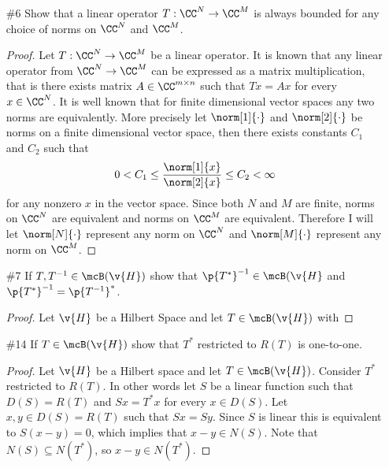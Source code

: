 \documentclass[11pt, oneside]{article}
\begin{document}
\begin{enumerate}
\begin{proof}
      Lastly I will show that $\norm{S} = \norm{T}$.
      Consider the following.
      \begin{align*}
        \norm{S} &= \sup*[x \in \overline{D(T)}]{\frac{\norm[Y]{Sx}}{\norm[X]{x}}} \\
      \end{align*}
    \end{proof}

  \pagebreak
  \item[\#6]
    Show that a linear operator $T:\CC^N \to \CC^M$ is always bounded for
    any choice of norms on $\CC^N$ and $\CC^M$.

    \begin{proof}
      Let $T:\CC^N \to \CC^M$ be a linear operator.
      It is known that any linear operator from $\CC^N \to \CC^M$ can be
      expressed as a matrix multiplication, that is there exists matrix
      $A \in \CC^{m \times n}$ such that $Tx = Ax$ for every $x \in \CC^N$.
      It is well known that for finite dimensional vector spaces any two norms
      are equivalently.
      More precisely let $\norm[1]{\cdot}$ and $\norm[2]{\cdot}$ be norms on a
      finite dimensional vector space, then there exists constants $C_1$ and $C_2$ such
      that
      \[
        0 < C_1 \le \frac{\norm[1]{x}}{\norm[2]{x}} \le C_2 < \infty
      \]
      for any nonzero $x$ in the vector space.
      Since both $N$ and $M$ are finite, norms on $\CC^N$ are equivalent
      and norms on $\CC^M$ are equivalent.
      Therefore I will let $\norm[N]{\cdot}$ represent any norm on $\CC^N$ and
      $\norm[M]{\cdot}$ represent any norm on $\CC^M$.
    \end{proof}

  \pagebreak
  \item[\#7]
    If $T, T^{-1} \in \mcB(\v{H})$ show that $\p{T^*}^{-1} \in \mcB(\v{H}$ and
    $\p{T^*}^{-1} = \p{T^{-1}}^*$.

    \begin{proof}
      Let $\v{H}$ be a Hilbert Space and let $T \in \mcB(\v{H})$ with 
    \end{proof}

  \pagebreak
  \item[\#14]
    If $T \in \mcB(\v{H})$ show that $T^*$ restricted to $R(T)$ is one-to-one.

    \begin{proof}
      Let $\v{H}$ be a Hilbert space and let $T \in \mcB(\v{H})$.
      Consider $T^*$ restricted to $R(T)$.
      In other words let $S$ be a linear function such that $D(S) = R(T)$ and
      $Sx = T^*x$ for every $x \in D(S)$.
      Let $x, y \in D(S) = R(T)$ such that $Sx = Sy$.
      Since $S$ is linear this is equivalent to $S(x - y) = 0$, which implies
      that $x - y \in N(S)$.
      Note that $N(S) \subseteq N(T^*)$, so $x - y \in N(T^*)$.
    \end{proof}
\end{enumerate}
\end{document}
